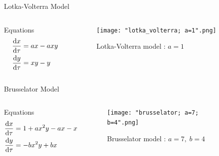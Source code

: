 \documentclass[xcolor]{beamer}
\begin{document}
\begin{frame}{Lotka-Volterra Model}
\begin{columns}
\begin{column}{0.4\textwidth}
\begin{block}{Equations}
\begin{align*}
\odv{x}{\tau} &= ax - axy \\
\odv{y}{\tau} &= xy - y
\end{align*}
\end{block}
\end{column}

\begin{column}{0.6\textwidth}
\begin{figure}[H]
\centering
\texttt{[image: "lotka\_volterra; a=1".png]}
\caption{Lotka-Volterra model  : \(a=1\)}
\end{figure}
\end{column}
\end{columns}
\end{frame}

\begin{frame}{Brusselator Model}
\begin{columns}
\begin{column}{0.4\textwidth}
\begin{block}{Equations}
\begin{align*}
\odv{x}{\tau} &= 1 + ax^{2}y - ax - x \\
\odv{y}{\tau} &= -bx^{2}y + bx
\end{align*}
\end{block}
\end{column}

\begin{column}{0.6\textwidth}
\begin{figure}[H]
\centering
\texttt{[image: "brusselator; a=7; b=4".png]}
\caption{Brusselator model  : \(a=7, \; b=4\)}
\end{figure}
\end{column}
\end{columns}
\end{frame}
\end{document}
